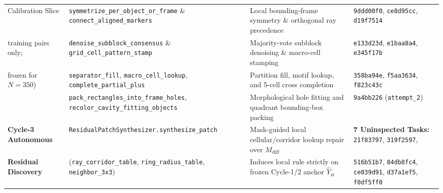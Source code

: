 \documentclass[10pt,a4paper]{article}
\begin{document}
\begin{table}[htbp]
{\begin{tabular}{llll}
Calibration Slice & \texttt{symmetrize\_per\_object\_or\_frame} \& \texttt{connect\_aligned\_markers} & Local bounding-frame symmetry \& orthogonal ray precedence & \texttt{9ddd00f0}, \texttt{ce8d95cc}, \texttt{d19f7514} \\
training pairs only; & \texttt{denoise\_subblock\_consensus} \& \texttt{grid\_cell\_pattern\_stamp} & Majority-vote subblock denoising \& macro-cell stamping & \texttt{e133d23d}, \texttt{e1baa8a4}, \texttt{e345f17b} \\
frozen for $N=350$) & \texttt{separator\_fill}, \texttt{macro\_cell\_lookup}, \texttt{complete\_partial\_plus} & Partition fill, motif lookup, and 5-cell cross completion & \texttt{358ba94e}, \texttt{f5aa3634}, \texttt{f823c43c} \\
 & \texttt{pack\_rectangles\_into\_frame\_holes}, \texttt{recolor\_cavity\_fitting\_objects} & Morphological hole fitting and quadrant bounding-box packing & \texttt{9a4bb226} (\texttt{attempt\_2}) \\
\midrule
\textbf{Cycle-3 Autonomous} & \texttt{ResidualPatchSynthesizer.synthesize\_patch} & Mask-guided local cellular/corridor lookup repair over $M_{\text{diff}}$ & \textbf{7 Uninspected Tasks:} \texttt{21f83797}, \texttt{319f2597}, \\
\textbf{Residual Discovery} & (\texttt{ray\_corridor\_table}, \texttt{ring\_radius\_table}, \texttt{neighbor\_3x3}) & Induces local rule strictly on frozen Cycle-1/2 anchor $\hat{Y}_{\text{st}}$ & \texttt{516b51b7}, \texttt{84db8fc4}, \texttt{ce039d91}, \texttt{d37a1ef5}, \texttt{f0df5ff0} \\
\bottomrule
\end{tabular}
}
\end{table}
\end{document}
